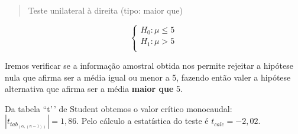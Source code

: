 \documentclass[
]{book}
\begin{document}
\hfill\break

\begin{quote}
Teste unilateral à direita (tipo: maior que)
\end{quote}

\hfill\break

\[
\begin{cases}
H_{0}: \mu \le 5\\
H_{1}: \mu > 5\\
\end{cases}
\]

\hfill\break

Iremos verificar se a informação amostral obtida nos permite rejeitar a hipótese nula que afirma ser a média igual ou menor a 5, fazendo então valer a hipótese alternativa que afirma ser a média \textbf{maior que} 5.

\hfill\break

Da tabela ``t'\,' de Student obtemos o valor crítico monocaudal: \(|{t}_{tab_(\alpha, (n-1))}|=1,86\). Pelo cálculo a estatística do teste é \(t_{calc}=-2,02\).

\hfill\break
\end{document}
